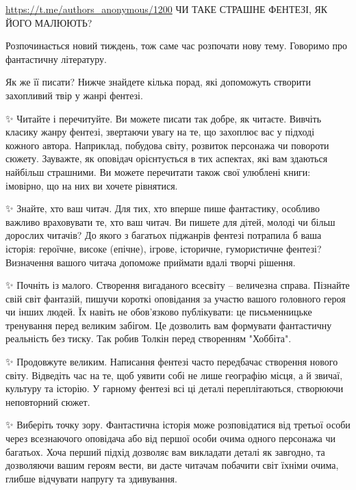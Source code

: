  
 
 
 
 

\url{https://t.me/authors_anonymous/1200}
ЧИ ТАКЕ СТРАШНЕ ФЕНТЕЗІ, ЯК ЙОГО МАЛЮЮТЬ? 🤔

Розпочинається новий тиждень, тож саме час розпочати нову тему.
Говоримо про фантастичну літературу.
 
Як же її писати? Нижче знайдете кілька порад, які допоможуть створити захопливий твір у жанрі фентезі.

✨ Читайте і перечитуйте. 
Ви можете писати так добре, як читаєте. Вивчіть класику жанру фентезі, звертаючи увагу на те, що захоплює вас у підході кожного автора. Наприклад, побудова світу, розвиток персонажа чи повороти сюжету. Зауважте, як оповідач орієнтується в тих аспектах, які вам здаються найбільш страшними. Ви можете перечитати також свої улюблені книги: імовірно, що на них ви хочете рівнятися.

✨ Знайте, хто ваш читач. 
Для тих, хто вперше пише фантастику, особливо важливо враховувати те, хто ваш читач. Ви пишете для дітей, молоді чи більш дорослих читачів? До якого з багатьох піджанрів фентезі потрапила б ваша історія: героїчне, високе (епічне), ігрове, історичне, гумористичне фентезі? Визначення вашого читача допоможе приймати вдалі творчі рішення.

✨ Почніть із малого. 
Створення вигаданого всесвіту – величезна справа. Пізнайте свій світ фантазій, пишучи короткі оповідання за участю вашого головного героя чи інших людей. Їх навіть не обов'язково публікувати: це письменницьке тренування перед великим забігом. Це дозволить вам формувати фантастичну реальність без тиску. Так робив Толкін перед створенням "Хоббіта".

✨ Продовжуте великим.
Написання фентезі часто передбачає створення нового світу. Відведіть час на те, щоб уявити собі не лише географію місця, а й звичаї, культуру та історію. У гарному фентезі всі ці деталі переплітаються, створюючи неповторний сюжет. 

✨ Виберіть точку зору. 
Фантастична історія може розповідатися від третьої особи через всезнаючого оповідача або від першої особи очима одного персонажа чи багатьох. Хоча перший підхід дозволяє вам викладати деталі як завгодно, та дозволяючи вашим героям вести, ви дасте читачам побачити світ їхніми очима, глибше відчувати напругу та здивування.

